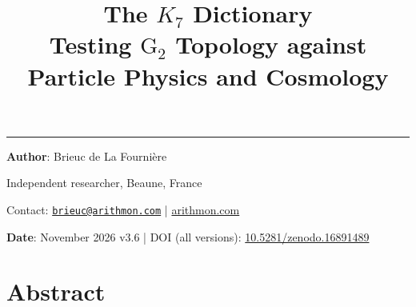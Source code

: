 \documentclass[11pt,a4paper]{article}
\title{%
\LARGE\textbf{The $K_7$ Dictionary}\\[0.3em]
\large Testing $\mathrm{G}_2$ Topology against Particle Physics and Cosmology%
}
\author{}
\date{}
\begin{document}
\maketitle
\noindent\rule{\textwidth}{0.2pt}

\noindent\textbf{Author}: Brieuc de La Fourni\`ere

\noindent Independent researcher, Beaune, France

\noindent Contact: \href{mailto:brieuc@arithmon.com}{\texttt{brieuc@arithmon.com}} \quad | \quad \href{https://arithmon.com}{arithmon.com}

\noindent\textbf{Date}: November 2026 \quad v3.6 \quad | \quad DOI (all versions): \href{https://doi.org/10.5281/zenodo.16891489}{10.5281/zenodo.16891489}

\enlargethispage{2\baselineskip}

\section{Abstract}\label{abstract}
\end{document}
